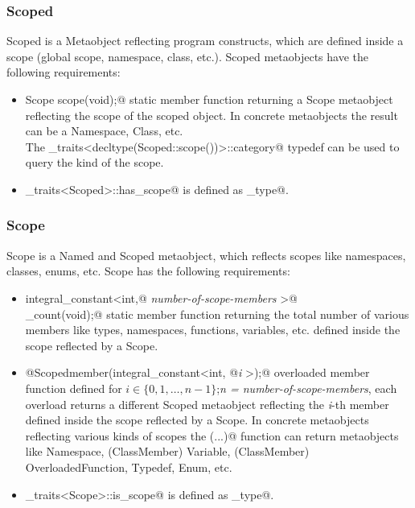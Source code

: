 \subsubsection{Scoped}

{\metaobject Scoped} is a {\metaobject Metaobject} reflecting program constructs,
which are defined inside a scope (global scope, namespace, class, etc.). {\metaobject Scoped}
metaobjects have the following requirements:

\begin{itemize}
	\item{\verb@static Scope scope(void);@} static member function returning
	a {\metaobject Scope} metaobject reflecting the scope of the scoped object.
	In concrete metaobjects the result can be a {\metaobject Namespace}, {\metaobject Class},
	etc.\\The \verb@metaobject_traits<decltype(Scoped::scope())>::category@ typedef can be used to
	query the kind of the scope.

	\item \verb@metaobject_traits<Scoped>::has_scope@ is defined as \verb@true_type@.
\end{itemize}

\subsubsection{Scope}

{\metaobject Scope} is a {\metaobject Named} and {\metaobject Scoped} metaobject,
which reflects scopes like namespaces, classes, enums, etc. {\metaobject Scope}
has the following requirements:

\begin{itemize}

	\item{\verb@static integral_constant<int,@ {\em number-of-scope-members}
	\verb@>@\\\verb@member_count(void);@} static member function returning the total number
	of various members like types, namespaces, functions, variables, etc. defined inside
	the scope reflected by a {\metaobject Scope}.

	\item{\verb@static @{\metaobject Scoped}\verb@ member(integral_constant<int, @{\em i}
	\verb@>);@} overloaded member function defined
	for $i \in \{0, 1, \dots, n-1\}$;{\em n = number-of-scope-members},
	each overload returns a different {\metaobject Scoped} metaobject reflecting the {\em i}-th member
	defined inside the scope reflected by a {\metaobject Scope}.
	In concrete metaobjects reflecting various kinds of scopes the \verb@member(...)@ function
	can return metaobjects like {\metaobject Namespace}, ({\metaobject ClassMember}) {\metaobject Variable},
	({\metaobject ClassMember}) {\metaobject OverloadedFunction}, {\metaobject Typedef},
	{\metaobject Enum}, etc.

	\item \verb@metaobject_traits<Scope>::is_scope@ is defined as \verb@true_type@.
\end{itemize}

